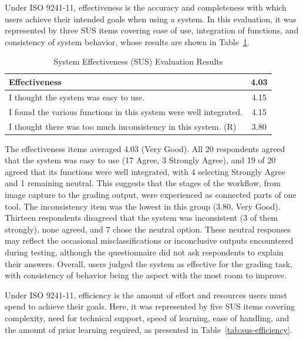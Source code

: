 \begin{thesisprose}
Under ISO 9241-11, effectiveness is the accuracy and completeness with which users achieve their intended goals when using a system. In this evaluation, it was represented by three SUS items covering ease of use, integration of functions, and consistency of system behavior, whose results are shown in Table~\ref{tab:sus-effectiveness}.

\begin{table}[htbp]
\centering
\caption{System Effectiveness (SUS) Evaluation Results}
\label{tab:sus-effectiveness}
\begin{tabularx}{\textwidth}{Xc}
\toprule
\textbf{Effectiveness} & \textbf{4.03} \\
\midrule
I thought the system was easy to use. & 4.15 \\
I found the various functions in this system were well integrated. & 4.15 \\
I thought there was too much inconsistency in this system. (R) & 3.80 \\
\bottomrule
\end{tabularx}
\end{table}

The effectiveness items averaged 4.03 (Very Good). All 20 respondents agreed that the system was easy to use (17 Agree, 3 Strongly Agree), and 19 of 20 agreed that its functions were well integrated, with 4 selecting Strongly Agree and 1 remaining neutral. This suggests that the stages of the workflow, from image capture to the grading output, were experienced as connected parts of one tool. The inconsistency item was the lowest in this group (3.80, Very Good). Thirteen respondents disagreed that the system was inconsistent (3 of them strongly), none agreed, and 7 chose the neutral option. These neutral responses may reflect the occasional misclassifications or inconclusive outputs encountered during testing, although the questionnaire did not ask respondents to explain their answers. Overall, users judged the system as effective for the grading task, with consistency of behavior being the aspect with the most room to improve.

Under ISO 9241-11, efficiency is the amount of effort and resources users must spend to achieve their goals. Here, it was represented by five SUS items covering complexity, need for technical support, speed of learning, ease of handling, and the amount of prior learning required, as presented in Table~\ref{tab:sus-efficiency}.


\end{thesisprose}
